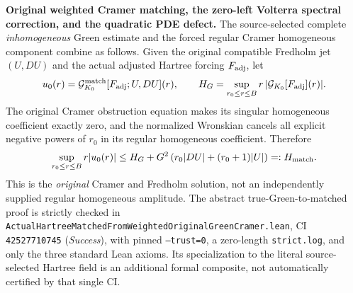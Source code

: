 \documentclass[11pt]{amsart}
\begin{document}
\medskip
\noindent\textbf{Original weighted Cramer matching, the zero-left
Volterra spectral correction, and the quadratic PDE defect.}
The source-selected complete \emph{inhomogeneous} Green estimate
and the forced regular Cramer homogeneous component combine as
follows. Given the original compatible Fredholm jet \((U,DU)\)
and the actual adjusted Hartree forcing \(F_{\rm adj}\), let
\[
 u_0(r)=\mathcal G^{\rm match}_{K_0}
       [F_{\rm adj};U,DU](r),\qquad
 H_G=\sup_{r_0\le r\le B}
     r\,|\mathcal G_{K_0}[F_{\rm adj}](r)|.
\]
The original Cramer obstruction equation makes its singular
homogeneous coefficient exactly zero, and the normalized Wronskian
cancels all explicit negative powers of \(r_0\) in its
regular homogeneous coefficient. Therefore
\begin{equation}
 \sup_{r_0\le r\le B}r|u_0(r)|
 \le H_G+G^2\left(r_0|DU|+(r_0+1)|U|\right)
 =:H_{\rm match}.
 \label{eq:hbl-selected-weighted-original-matched}
\end{equation}
This is the \emph{original} Cramer and Fredholm solution, not an
independently supplied regular homogeneous amplitude.
The abstract true-Green-to-matched proof is strictly checked in
\texttt{ActualHartreeMatchedFromWeightedOriginalGreenCramer.lean},
CI \texttt{42527710745} (\emph{Success}), with pinned
\texttt{--trust=0}, a zero-length \texttt{strict.log}, and only
the three standard Lean axioms. Its specialization to the literal
source-selected Hartree field is an additional formal composite,
not automatically certified by that single CI.
\end{document}

